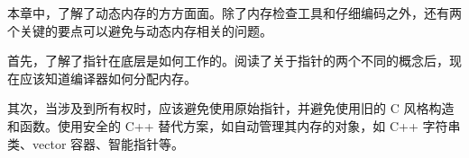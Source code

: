 本章中，了解了动态内存的方方面面。除了内存检查工具和仔细编码之外，还有两个关键的要点可以避免与动态内存相关的问题。

首先，了解了指针在底层是如何工作的。阅读了关于指针的两个不同的概念后，现在应该知道编译器如何分配内存。

其次，当涉及到所有权时，应该避免使用原始指针，并避免使用旧的 C 风格构造和函数。使用安全的 C++ 替代方案，如自动管理其内存的对象，如 C++ 字符串类、vector 容器、智能指针等。
